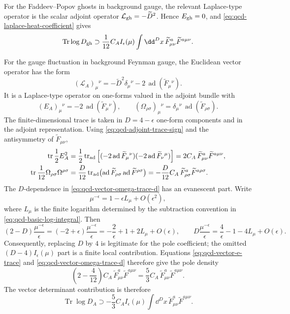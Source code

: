 For the Faddeev--Popov ghosts in background gauge, the relevant Laplace-type
operator is the scalar adjoint operator \(\mathcal L_{\rm gh}=-\widetilde
D^2\).  Hence \(E_{\rm gh}=0\), and
\eqref{eq:qcd-laplace-heat-coefficient} gives
\begin{equation}
  \operatorname{Tr}\log D_{\rm gh}
  \supset
  \frac1{12}C_A I_\epsilon(\mu)
  \int\dd^Dx\,
  \widetilde F^a_{\mu\nu}\widetilde F^{a\mu\nu}.
  \label{eq:qcd-ghost-determinant-f2}
\end{equation}

For the gauge fluctuation in background Feynman gauge, the Euclidean vector
operator has the form
\[
  (\mathcal L_A)_\mu{}^\nu
  =
  -\widetilde D^2\delta_\mu{}^\nu
  -2\,\operatorname{ad}(\widetilde F_\mu{}^\nu).
\]
It is a Laplace-type operator on one-forms valued in the adjoint bundle with
\[
  (E_A)_\mu{}^\nu=-2\,\operatorname{ad}(\widetilde F_\mu{}^\nu),
  \qquad
  (\Omega_{\rho\sigma})_\mu{}^\nu
  =
  \delta_\mu{}^\nu\,\operatorname{ad}(\widetilde F_{\rho\sigma}).
\]
The finite-dimensional trace is taken in \(D=4-\epsilon\) one-form
components and in the adjoint representation.  Using
\eqref{eq:qcd-adjoint-trace-sign} and the antisymmetry of
\(\widetilde F_{\mu\nu}\),
\begin{align}
  \operatorname{tr}\frac12E_A^2
  &=
  \frac12\operatorname{tr}_{\rm ad}
  \left[
    (-2\operatorname{ad}\widetilde F_\mu{}^\nu)
    (-2\operatorname{ad}\widetilde F_\nu{}^\mu)
  \right]
  =
  2C_A\,\widetilde F^a_{\mu\nu}\widetilde F^{a\mu\nu},
  \label{eq:qcd-vector-e-trace}\\
  \operatorname{tr}\frac1{12}\Omega_{\rho\sigma}\Omega^{\rho\sigma}
  &=
  \frac{D}{12}\operatorname{tr}_{\rm ad}
  \bigl(
    \operatorname{ad}\widetilde F_{\rho\sigma}
    \operatorname{ad}\widetilde F^{\rho\sigma}
  \bigr)
  =
  -\frac{D}{12}C_A\,
  \widetilde F^a_{\rho\sigma}\widetilde F^{a\rho\sigma}.
  \label{eq:qcd-vector-omega-trace-d}
\end{align}
The \(D\)-dependence in \eqref{eq:qcd-vector-omega-trace-d} has an
evanescent part.  Write
\[
  \mu^{-\epsilon}=1-\epsilon L_\mu+O(\epsilon^2),
\]
where \(L_\mu\) is the finite logarithm determined by the subtraction
convention in \eqref{eq:qcd-basic-log-integral}.  Then
\[
  (2-D)\frac{\mu^{-\epsilon}}{\epsilon}
  =
  (-2+\epsilon)\frac{\mu^{-\epsilon}}{\epsilon}
  =
  -\frac2\epsilon+1+2L_\mu+O(\epsilon),
  \qquad
  D\frac{\mu^{-\epsilon}}{\epsilon}
  =
  \frac4\epsilon-1-4L_\mu+O(\epsilon).
\]
Consequently, replacing \(D\) by \(4\) is legitimate for the pole
coefficient; the omitted \((D-4)I_\epsilon(\mu)\) part is a finite local
contribution.
Equations \eqref{eq:qcd-vector-e-trace} and
\eqref{eq:qcd-vector-omega-trace-d} therefore give the pole density
\[
  \left(
    2-\frac{4}{12}
  \right)C_A\,
  \widetilde F^a_{\mu\nu}\widetilde F^{a\mu\nu}
  =
  \frac53C_A\,
  \widetilde F^a_{\mu\nu}\widetilde F^{a\mu\nu}.
\]
The vector determinant contribution is therefore
\begin{equation}
  \operatorname{Tr}\log D_A
  \supset
  -\frac53 C_A I_\epsilon(\mu)
  \int\dd^Dx\,
  \widetilde F^a_{\mu\nu}\widetilde F^{a\mu\nu}.
  \label{eq:qcd-vector-determinant-f2}
\end{equation}

